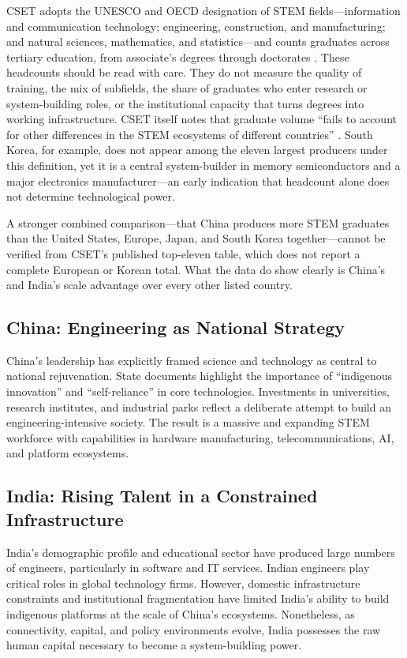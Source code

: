 \documentclass[12pt,letterpaper]{article}
\begin{document}
CSET adopts the UNESCO and OECD designation of STEM fields---information and communication technology; engineering, construction, and manufacturing; and natural sciences, mathematics, and statistics---and counts graduates across tertiary education, from associate's degrees through doctorates \cite{oliss2023}. These headcounts should be read with care. They do not measure the quality of training, the mix of subfields, the share of graduates who enter research or system-building roles, or the institutional capacity that turns degrees into working infrastructure. CSET itself notes that graduate volume ``fails to account for other differences in the STEM ecosystems of different countries'' \cite{oliss2023}. South Korea, for example, does not appear among the eleven largest producers under this definition, yet it is a central system-builder in memory semiconductors and a major electronics manufacturer---an early indication that headcount alone does not determine technological power.

A stronger combined comparison---that China produces more STEM graduates than the United States, Europe, Japan, and South Korea together---cannot be verified from CSET's published top-eleven table, which does not report a complete European or Korean total. What the data do show clearly is China's and India's scale advantage over every other listed country.

\subsection{China: Engineering as National Strategy}

China's leadership has explicitly framed science and technology as central to national rejuvenation. State documents highlight the importance of ``indigenous innovation'' and ``self-reliance'' in core technologies. Investments in universities, research institutes, and industrial parks reflect a deliberate attempt to build an engineering-intensive society. The result is a massive and expanding STEM workforce with capabilities in hardware manufacturing, telecommunications, AI, and platform ecosystems.

\subsection{India: Rising Talent in a Constrained Infrastructure}

India's demographic profile and educational sector have produced large numbers of engineers, particularly in software and IT services. Indian engineers play critical roles in global technology firms. However, domestic infrastructure constraints and institutional fragmentation have limited India's ability to build indigenous platforms at the scale of China's ecosystems. Nonetheless, as connectivity, capital, and policy environments evolve, India possesses the raw human capital necessary to become a system-building power.
\end{document}
